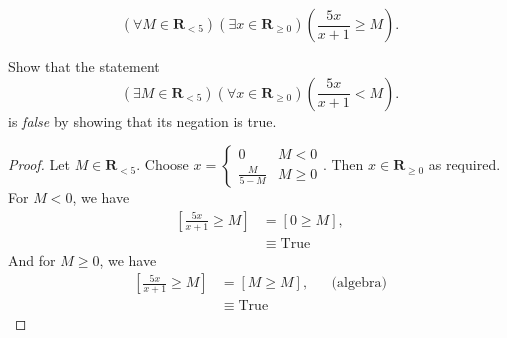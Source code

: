 \documentclass[12pt,fleqn,answers]{exam}
\newcommand{\reals}{\mathbf{R}}
\newcommand{\true}{\mathrm{True}}
\begin{document}
\begin{questions}
\begin{solution}
  \begin{equation*}
    \left(\forall M \in  \reals_{< 5} \right)
    \left(\exists x \in  \reals_{\geq 0} \right) 
    \left(\frac{5 x}{x+1} \geq   M \right).
    \end{equation*}  
\end{solution}

\question [10]  Show that the statement 
\begin{equation*}
\left(\exists M \in  \reals_{< 5} \right)
\left(\forall x \in  \reals_{\geq 0} \right) \left(\frac{5 x}{x+1}  < M \right).
\end{equation*}
is \emph{false} by showing that its negation is true.

\begin{proof} Let $M \in \reals_{< 5}$. Choose 
  $x = \begin{cases}  0 & M < 0 \\
                      \frac{M}{5-M} & M \geq 0 
  \end{cases}$. Then $x \in \reals_{\geq 0}$ as required.
  For $M < 0$, we have
  \begin{align*}
    \left[ \frac{5 x}{x+1}  \geq  M \right] &= \left[0 \geq  M \right], \\
                                            &\equiv \true
  \end{align*}
  And for $M \geq 0$, we have
  \begin{align*}
    \left[ \frac{5 x}{x+1}  \geq  M \right] 
       &= \left[M \geq  M \right], &&\text{(algebra)} \\
      &\equiv \true
  \end{align*}


\end{proof}
 
\end{questions}
\end{document}
